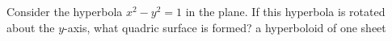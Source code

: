 {Consider the hyperbola $x^2-y^2=1$ in the plane. If this hyperbola is rotated about the $y$-axis, what quadric surface is formed?
}
{a hyperboloid of one sheet
}
